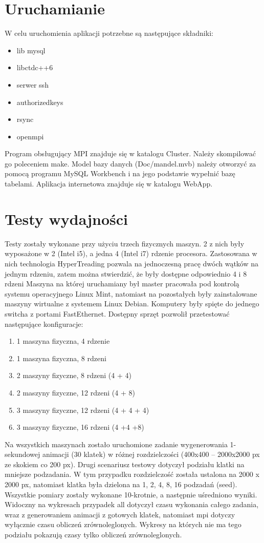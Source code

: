 \documentclass[a4paper]{article}
\begin{document}
\newpage

\section{Uruchamianie}
W celu uruchomienia aplikacji potrzebne są następujące składniki:
\begin{itemize}
\item lib mysql
\item libctdc++6
\item serwer ssh
\item authorizedkeys
\item rsync
\item openmpi
\end{itemize}

Program obsługujący MPI znajduje się w katalogu Cluster. Należy skompilować go poleceniem make. Model bazy danych (Doc/mandel.mvb) należy otworzyć za pomocą programu MySQL Workbench i na jego podstawie wypełnić bazę tabelami. Aplikacja internetowa znajduje się w katalogu WebApp.

\section{Testy wydajności}
Testy zostały wykonane przy użyciu trzech fizycznych maszyn. 2 z nich były wyposażone w 2 (Intel i5), a jedna 4 (Intel i7) rdzenie procesora. Zastosowana w nich technologia HyperTreading pozwala na jednoczesną pracę dwóch wątków na jednym rdzeniu, zatem można stwierdzić, że były dostępne odpowiednio 4 i 8 rdzeni Maszyna na której uruchamiany był master pracowała pod kontrolą systemu operacyjnego Linux Mint, natomiast na pozostałych były zainstalowane maszyny wirtualne z systemem Linux Debian. Komputery były spięte do jednego switcha z portami FastEthernet. Dostępny sprzęt pozwolił przetestować następujące konfiguracje:
\begin{enumerate}
\item 1 maszyna fizyczna, 4 rdzenie
\item 1 maszyna fizyczna, 8 rdzeni
\item 2 maszyny fizyczne, 8 rdzeni (4 + 4)
\item 2 maszyny fizyczne, 12 rdzeni (4 + 8)
\item 3 maszyny fizyczne, 12 rdzeni (4 + 4 + 4)
\item 3 maszyny fizyczne, 16 rdzeni (4 +4 +8)
\end{enumerate}

Na wszystkich maszynach zostało uruchomione zadanie wygenerowania 1-sekundowej animacji (30 klatek) w różnej rozdzielczości (400x400 – 2000x2000 px ze skokiem co 200 px). Drugi scenariusz testowy dotyczył podziału klatki na mniejsze podzadania. W tym przypadku rozdzielczość została ustalona na 2000 x 2000 px, natomiast klatka była dzielona na 1, 2, 4, 8, 16 podzadań (seed). Wszystkie pomiary zostały wykonane 10-krotnie, a następnie uśredniono wyniki. Widoczny na wykresach przypadek all dotyczył czasu wykonania całego zadania, wraz z generowaniem animacji z gotowych klatek, natomiast mpi dotyczy wyłącznie czasu obliczeń zrównoleglonych. Wykresy na których nie ma tego podziału pokazują czasy tylko obliczeń zrównoleglonych.
\end{document}
